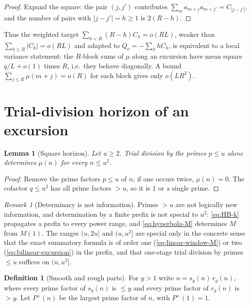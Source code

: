 \documentclass[11pt]{amsart}
\numberwithin{equation}{section}
\theoremstyle{plain}
\newtheorem{lemma}[theorem]{Lemma}
\theoremstyle{definition}
\newtheorem{definition}[theorem]{Definition}
\theoremstyle{remark}
\newtheorem{remark}[theorem]{Remark}
\newcommand{\Pp}{P^{+}}
\begin{document}
\begin{proof}
Expand the square: the pair $(j,j')$ contributes $\sum_ma_{m+j}a_{m+j'}
=C_{|j-j'|}$, and the number of pairs with $|j-j'|=h\ge1$ is $2(R-h)$.
\end{proof}

Thus the weighted target $\sum_{h<R}(R-h)C_h=o(RL)$, weaker than
$\sum_{h\le R}|C_h|=o(RL)$ and adapted to $Q_\nu=-\sum_hhC_h$, is equivalent
to a local variance statement: the $R$-block sums of $\mu$ along an excursion
have mean square $q/L+o(1)$ times $R$, i.e.\ they behave diagonally. A bound
$\sum_{j\le R}\mu(m+j)=o(R)$ for each block gives only $o(LR^2)$.


\section{Trial-division horizon of an excursion}
\label{sec:prime_horizon}

\begin{lemma}[Square horizon]
\label{lem:square-horizon}
Let $u\ge2$. Trial division by the primes $p\le u$ alone determines $\mu(n)$
for every $n\le u^2$.
\end{lemma}

\begin{proof}
Remove the prime factors $p\le u$ of $n$; if one occurs twice, $\mu(n)=0$.
The cofactor $q\le u^2$ has all prime factors $>u$, so it is $1$ or a single
prime.
\end{proof}

\begin{remark}[Determinacy is not information]
\label{rem:information}
\label{warn:information_language}
Primes $>u$ are not logically new information, and determination by a
finite prefix is not special to $u^2$: \eqref{eq:HB-k} propagates a prefix
to every power range, and \eqref{eq:hyperbola-M} determines $M$ from $M(1)$.
The ranges $(u,2u]$ and $(u,u^2]$ are special only in the concrete sense
that the exact summatory formula is of order one
(\eqref{eq:linear-window-M}) or two (\eqref{eq:bilinear-excursion}) in the
prefix, and that one-stage trial division by primes $\le u$ suffices on
$(u,u^2]$.
\end{remark}

\begin{definition}[Smooth and rough parts]
\label{def:smooth_rough}
For $y>1$ write $n=s_y(n)\,r_y(n)$, where every prime factor of $s_y(n)$
is $\le y$ and every prime factor of $r_y(n)$ is $>y$. Let $\Pp(n)$ be the
largest prime factor of $n$, with $\Pp(1)=1$.
\end{definition}
\end{document}

